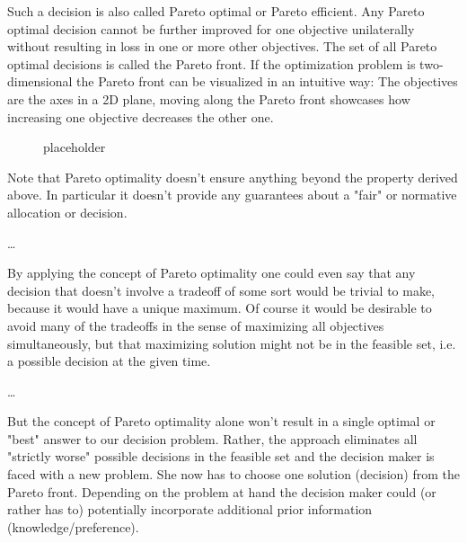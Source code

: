 	Such a decision is also called Pareto optimal or Pareto efficient.
	Any Pareto optimal decision cannot be further improved for one objective unilaterally without resulting in loss in one or more other objectives.
	The set of all Pareto optimal decisions is called the Pareto front.
	If the optimization problem is two-dimensional the Pareto front can be visualized in an intuitive way:
	The objectives are the axes in a 2D plane, moving along the Pareto front showcases how increasing one objective decreases the other one.

	\begin{figure}
	\begin{center}
			
	\caption{placeholder}
	\end{center}
	\end{figure}

	Note that Pareto optimality doesn't ensure anything beyond the property derived above.
	In particular it doesn't provide any guarantees about a "fair" or normative allocation or decision.
	
	\dots

	By applying the concept of Pareto optimality one could even say that any decision that doesn't involve a tradeoff of some sort would be trivial to make, because it would have a unique maximum.
	Of course it would be desirable to avoid many of the tradeoffs in the sense of maximizing all objectives simultaneously, but that maximizing solution might not be in the feasible set, i.e. a possible decision at the given time.

	\dots

	But the concept of Pareto optimality alone won't result in a single optimal or "best" answer to our decision problem.
	Rather, the approach eliminates all "strictly worse" possible decisions in the feasible set and the decision maker is faced with a new problem.
	She now has to choose one solution (decision) from the Pareto front.
	Depending on the problem at hand the decision maker could (or rather has to) potentially incorporate additional prior information (knowledge/preference).

